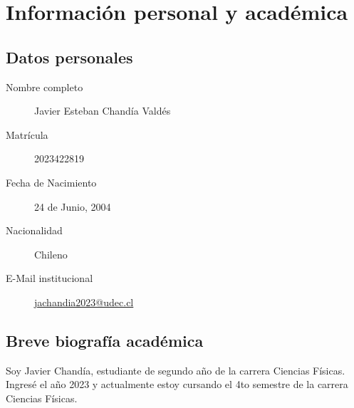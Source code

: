 
\chapter*{Información personal y académica}


\section*{Datos personales}

\begin{description}
\item[{Nombre completo}] Javier Esteban Chandía Valdés %
\item[{Matrícula}] 2023422819               %
\item[{Fecha de Nacimiento}] 24 de Junio, 2004 %
\item[{Nacionalidad}] Chileno
\item[{E-Mail institucional}] \href{mailto:jachandia2023@udec.cl}{jachandia2023@udec.cl}
\end{description}


\section*{Breve biografía académica}

Soy Javier Chandía, estudiante de segundo año de la carrera Ciencias Físicas.
Ingresé el año 2023 y actualmente estoy cursando el 4to semestre de la carrera Ciencias Físicas.

